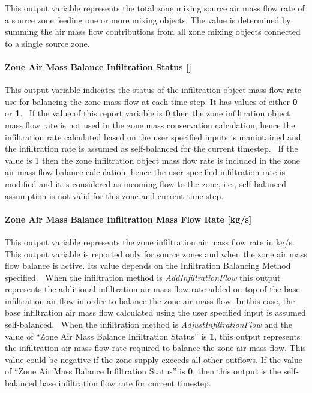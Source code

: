 This output variable represents the total zone mixing source air mass flow rate of a source zone feeding one or more mixing objects. The value is determined by summing the air mass flow contributions from all zone mixing objects connected to a single source zone.

\paragraph{Zone Air Mass Balance Infiltration Status {[]}}\label{zone-air-mass-balance-infiltration-status}

This output variable indicates the status of the infiltration object mass flow rate use for balancing the zone mass flow at each time step. It has values of either \textbf{0} or \textbf{1}.~ If the value of this report variable is \textbf{0} then the zone infiltration object mass flow rate is not used in the zone mass conservation calculation, hence the infiltration rate calculated based on the user specified inputs is manintained and the infiltration rate is assumed as self-balanced for the current timestep.~ If the value is 1 then the zone infiltration object mass flow rate is included in the zone air mass flow balance calculation, hence the user specified infiltration rate is modified and it is considered as incoming flow to the zone, i.e., self-balanced assumption is not valid for this zone and current time step.

\paragraph{Zone Air Mass Balance Infiltration Mass Flow Rate {[}kg/s{]}}\label{zone-air-mass-balance-infiltration-mass-flow-rate-kgs}

This output variable represents the zone infiltration air mass flow rate in kg/s.~ This output variable is reported only for source zones and when the zone air mass flow balance is active. Its value depends on the Infiltration Balancing Method specified.~ When the infiltration method is \emph{AddInfiltrationFlow} this output represents the additional infiltration air mass flow rate added on top of the base infiltration air flow in order to balance the zone air mass flow. In this case, the base infiltration air mass flow calculated using the user specified input is assumed self-balanced.~ When the infiltration method is \emph{AdjustInfiltrationFlow} and the value of ``Zone Air Mass Balance Infiltration Status'' is \textbf{1}, this output represents the infiltration air mass flow rate required to balance the zone air mass flow. This value could be negative if the zone supply exceeds all other outflows. If the value of ``Zone Air Mass Balance Infiltration Status'' is \textbf{0}, then this output is the self-balanced base infiltration flow rate for current timestep.